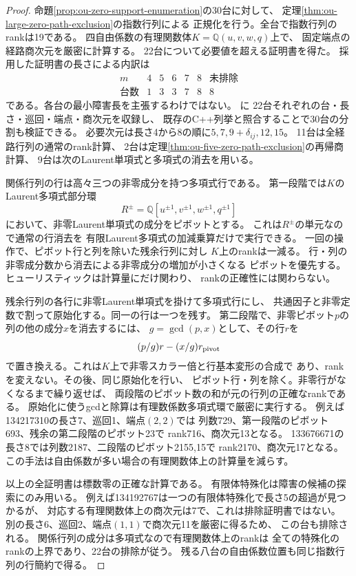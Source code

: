 \begin{proof}
命題\ref{prop:ou-zero-support-enumeration}の30台に対して、
定理\ref{thm:ou-large-zero-path-exclusion}の指数行列による
正規化を行う。全台で指数行列のrankは19である。
四自由係数の有理関数体$K=\mathbb Q(u,v,w,q)$上で、
固定端点の経路商次元を厳密に計算する。
22台について必要値を超える証明書を得た。
採用した証明書の長さによる内訳は
\[
\begin{array}{c|rrrrr|r}
m&4&5&6&7&8&\text{未排除}\\ \hline
\text{台数}&1&3&3&7&8&8
\end{array}
\]
である。各台の最小障害長を主張するわけではない。
に
22台それぞれの台・長さ・巡回・端点・商次元を収録し、
既存のC++列挙と照合することで30台の分割も検証できる。
必要次元は長さ4から8の順に$5,7,9+\delta_{ij},12,15$。
11台は全経路行列の通常のrank計算、
2台は定理\ref{thm:ou-five-zero-path-exclusion}の再帰商計算、
9台は次のLaurent単項式と多項式の消去を用いる。

関係行列の行は高々三つの非零成分を持つ多項式行である。
第一段階では$K$のLaurent多項式部分環
\[
 R^{\pm}=\mathbb Q[u^{\pm1},v^{\pm1},w^{\pm1},q^{\pm1}]
\]
において、非零Laurent単項式の成分をピボットとする。
これは$R^{\pm}$の単元なので通常の行消去を
有限Laurent多項式の加減乗算だけで実行できる。
一回の操作で、ピボット行と列を除いた残余行列に対し
$K$上のrankは一減る。
行・列の非零成分数から消去による非零成分の増加が小さくなる
ピボットを優先する。ヒューリスティックは計算量にだけ関わり、
rankの正確性には関わらない。

残余行列の各行に非零Laurent単項式を掛けて多項式行にし、
共通因子と非零定数で割って原始化する。同一の行は一つを残す。
第二段階で、非零ピボット$p$の列の他の成分$x$を消去するには、
$g=\gcd(p,x)$として、その行$r$を
\[
 (p/g)r-(x/g)r_{\rm pivot}
\]
で置き換える。これは$K$上で非零スカラー倍と行基本変形の合成で
あり、rankを変えない。その後、同じ原始化を行い、
ピボット行・列を除く。非零行がなくなるまで繰り返せば、
両段階のピボット数の和が元の行列の正確なrankである。
原始化に使うgcdと除算は有理数係数多項式環で厳密に実行する。
例えば134217310の長さ7、巡回1、端点$(2,2)$では
列数729、第一段階のピボット693、残余の第二段階のピボット23で
rank716、商次元13となる。
133676671の長さ8では列数2187、二段階のピボット2155,15で
rank2170、商次元17となる。
この手法は自由係数が多い場合の有理関数体上の計算量を減らす。

以上の全証明書は標数零の正確な計算である。
有限体特殊化は障害の候補の探索にのみ用いる。
例えば134192767は一つの有限体特殊化で長さ5の超過が見つかるが、
対応する有理関数体上の商次元は7で、これは排除証明書ではない。
別の長さ6、巡回2、端点$(1,1)$で商次元11を厳密に得るため、
この台も排除される。
関係行列の成分は多項式なので有理関数体上のrankは
全ての特殊化のrankの上界であり、22台の排除が従う。
残る八台の自由係数位置も同じ指数行列の行簡約で得る。
\end{proof}

